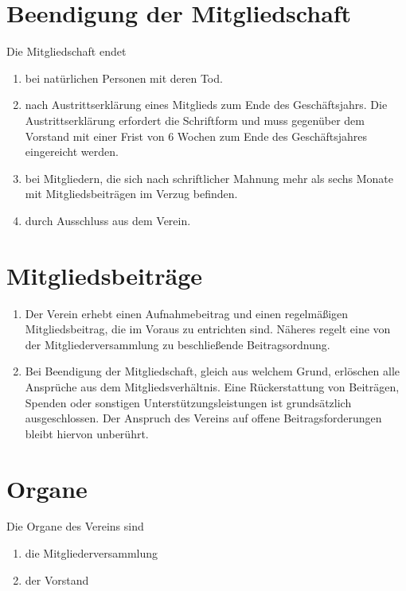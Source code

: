 \documentclass[a4paper, 12pt]{scrartcl}
\begin{document}
\section{Beendigung der Mitgliedschaft}
Die Mitgliedschaft endet
\begin{enumerate}
	\item bei natürlichen Personen mit deren Tod.
	\item nach Austrittserklärung eines Mitglieds zum Ende des Geschäftsjahrs. Die Austrittserklärung erfordert die Schriftform und muss gegenüber dem Vorstand mit einer Frist von 6 Wochen zum Ende des Geschäftsjahres eingereicht werden.
	\item bei Mitgliedern, die sich nach schriftlicher Mahnung mehr als sechs Monate mit Mitgliedsbeiträgen im Verzug befinden.
	\item durch Ausschluss aus dem Verein.
\end{enumerate}

\section{Mitgliedsbeiträge}
\begin{enumerate}
	\item Der Verein erhebt einen Aufnahmebeitrag und einen regelmäßigen Mitgliedsbeitrag, die im Voraus zu entrichten sind. Näheres regelt eine von der Mitgliederversammlung zu beschließende Beitragsordnung.
	\item Bei Beendigung der Mitgliedschaft, gleich aus welchem Grund, erlöschen alle Ansprüche aus dem Mitgliedsverhältnis. Eine Rückerstattung von Beiträgen, Spenden oder sonstigen Unterstützungsleistungen ist grundsätzlich ausgeschlossen. Der Anspruch des Vereins auf offene Beitragsforderungen bleibt hiervon unberührt.
\end{enumerate}

\section{Organe}
Die Organe des Vereins sind
\begin{enumerate}
	\item die Mitgliederversammlung
	\item der Vorstand
\end{enumerate}
\end{document}
